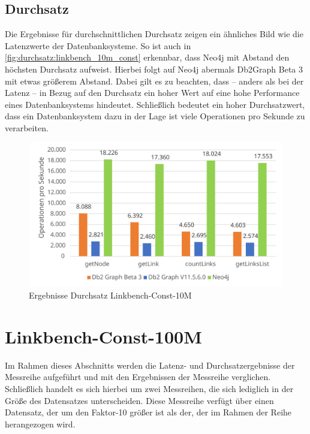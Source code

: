\subsection{Durchsatz}
Die Ergebnisse für durchschnittlichen Durchsatz zeigen ein ähnliches Bild wie die Latenzwerte der Datenbanksysteme. So ist auch in \autoref{fig:durchsatz:linkbench_10m_const} erkennbar, dass Neo4j mit Abstand den höchsten Durchsatz aufweist. Hierbei folgt auf Neo4j abermals Db2Graph Beta 3 mit etwas größerem Abstand. Dabei gilt es zu beachten, dass -- anders als bei der Latenz -- in Bezug auf den Durchsatz ein hoher Wert auf eine hohe Performance eines Datenbanksystems hindeutet. Schließlich bedeutet ein hoher Durchsatzwert, dass ein Datenbanksystem dazu in der Lage ist viele Operationen pro Sekunde zu verarbeiten.

\begin{figure}[!ht]
    \centering
    \includegraphics[width=\textwidth]{images/diagramme/linkbench_10m_const_durchsatz.pdf}
    \caption{Ergebnisse Durchsatz Linkbench-Const-10M}
    \label{fig:durchsatz:linkbench_10m_const}
\end{figure}

\section{Linkbench-Const-100M}
\label{ergebnisse:100m_const}
Im Rahmen dieses Abschnitts werden die Latenz- und Durchsatzergebnisse der Messreihe  aufgeführt und mit den Ergebnissen der Messreihe  verglichen. Schließlich handelt es sich hierbei um zwei Messreihen, die sich lediglich in der Größe des Datensatzes unterscheiden. Diese Messreihe verfügt über einen Datensatz, der um den Faktor-10 größer ist als der, der im Rahmen der Reihe  herangezogen wird. 


